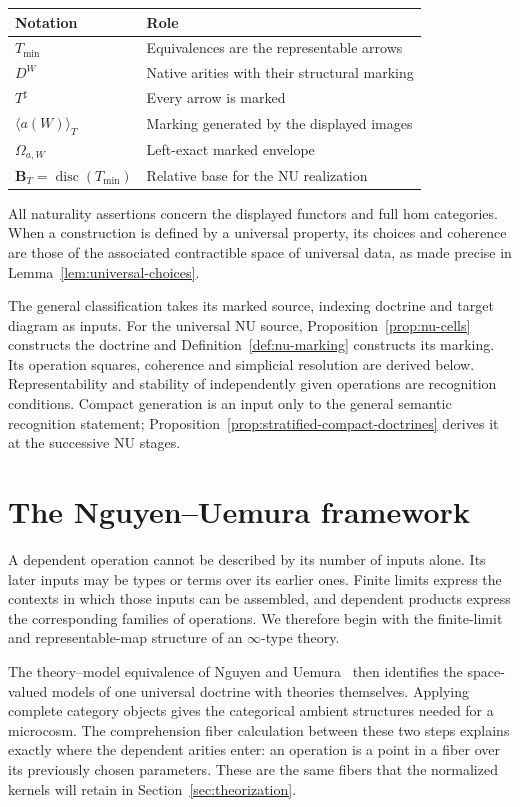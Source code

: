 \documentclass[oneside]{article}
\theoremstyle{plain}
\theoremstyle{definition}
\theoremstyle{remark}
\newcommand{\B}{\mathbf B}
\newcommand{\disc}{\operatorname{disc}}
\newcommand{\minrep}{\mathrm{min}}
\begin{document}
\begin{center}
\begin{tabular}{@{}ll@{}}
\toprule
Notation & Role \\
\midrule
$T_{\minrep}$ & Equivalences are the representable arrows \\
$D^W$ & Native arities with their structural marking \\
$T^\sharp$ & Every arrow is marked \\
$\langle a(W)\rangle_T$ & Marking generated by the displayed images \\
$\Omega_{a,W}$ & Left-exact marked envelope \\
$\B_T=\disc(T_{\minrep})$ & Relative base for the NU realization \\
\bottomrule
\end{tabular}
\end{center}
All naturality assertions concern the displayed functors and full hom
categories. When a construction is defined by a universal property, its
choices and coherence are those of the associated contractible space of
universal data, as made precise in Lemma~\ref{lem:universal-choices}.

The general classification takes its marked source, indexing doctrine
and target diagram as inputs. For the universal NU source,
Proposition~\ref{prop:nu-cells} constructs the doctrine and
Definition~\ref{def:nu-marking} constructs its marking. Its operation
squares, coherence and simplicial resolution are derived below.
Representability and stability of independently given operations are
recognition conditions. Compact generation is an input only to the
general semantic recognition statement; Proposition~\ref{prop:stratified-compact-doctrines}
derives it at the successive NU stages.

\section{The Nguyen--Uemura framework}
\label{sec:nu-foundations}

A dependent operation cannot be described by its number of inputs alone.
Its later inputs may be types or terms over its earlier ones. Finite
limits express the contexts in which those inputs can be assembled, and
dependent products express the corresponding families of operations.
We therefore begin with the finite-limit and representable-map structure
of an $\infty$-type theory.

The theory--model equivalence of Nguyen and Uemura~\cite{NguyenUemura2025}
then identifies the space-valued models of one universal doctrine with
theories themselves. Applying complete category objects gives the
categorical ambient structures needed for a microcosm. The comprehension
fiber calculation between these two steps explains exactly where the
dependent arities enter: an operation is a point in a fiber over its
previously chosen parameters. These are the same fibers that the
normalized kernels will retain in Section~\ref{sec:theorization}.
\end{document}
